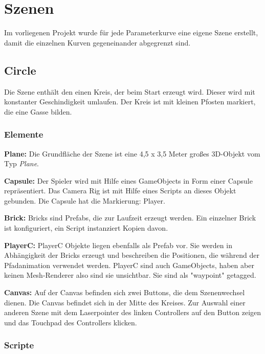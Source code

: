 
\chapter{Szenen}
\label{Szenen}

Im vorliegenen Projekt wurde für jede Parameterkurve eine eigene Szene erstellt, damit die einzelnen Kurven gegeneinander abgegrenzt sind.


\section{Circle}
\label{Kreis}

Die Szene enthält den einen Kreis, der beim Start erzeugt wird. Dieser wird mit konstanter Geschindigkeit umlaufen. Der Kreis ist mit kleinen Pfosten markiert, die eine Gasse bilden. 

\subsection{Elemente}

\textbf{Plane: } Die Grundfläche der Szene ist eine 4,5 x 3,5 Meter großes 3D-Objekt vom Typ \emph{Plane}.

\textbf{Capsule: } Der Spieler wird mit Hilfe eines GameObjects in Form einer Capsule repräsentiert. Das Camera Rig ist mit Hilfe eines Scripts an dieses Objekt gebunden. Die Capsule hat die Markierung: Player.

\textbf{Brick: } Bricks sind Prefabs, die zur Laufzeit erzeugt werden. Ein einzelner Brick ist konfiguriert, ein Script instanziert Kopien davon.

\textbf{PlayerC: } PlayerC Objekte liegen ebenfalls als Prefab vor. Sie werden in Abhängigkeit der Bricks erzeugt und beschreiben die Positionen, die während der Pfadanimation verwendet werden. PlayerC sind auch GameObjects, haben aber keinen Mesh-Renderer also sind sie unsichtbar. Sie sind als "waypoint" getagged.

\textbf{Canvas: } Auf der Canvas befinden sich zwei Buttons, die dem Szenenwechsel dienen. Die Canvas befindet sich in der Mitte des Kreises. Zur Auswahl einer anderen Szene mit dem Laserpointer des linken Controllers auf den Button zeigen und das Touchpad des Controllers klicken. 


\subsection{Scripte}
\label{Circle_Scripts}

